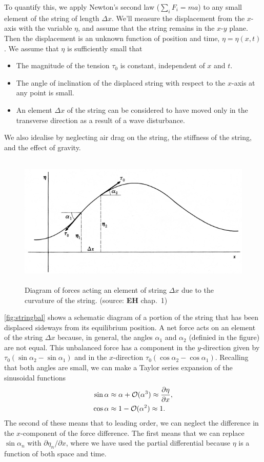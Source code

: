 \documentclass[11pt,twoside,a4paper]{article}
\begin{document}
To quantify this, we apply Newton's second law ($\sum_i F_i=ma$) to
any small element of the string of length $\Delta x$. We'll measure
the displacement from the $x$-axis with the variable $\eta$, and
assume that the string remains in the $x$-$y$ plane.  Then the
displacement is an unknown function of position and time,
$\eta=\eta(x,t)$.  We assume that $\eta$ is sufficiently small that
\begin{itemize}
\item The magnitude of the tension $\tau_0$ is constant, independent
  of $x$ and $t$.
\item The angle of inclination of the displaced string with respect to
  the $x$-axis at any point is small.
\item An element $\Delta x$ of the string can be considered to have
  moved only in the transverse direction as a result of a wave
  disturbance.
\end{itemize}
We also idealise by neglecting air drag on the string, the stiffness
of the string, and the effect of gravity.

\begin{figure}[ht]
  \centering
  \includegraphics[height=2.5in]{../figs/L19/StringDiagram}
  \caption{Diagram of forces acting an element of string $\Delta x$
    due to the curvature of the string. (source: \textbf{EH} chap.~1)}
  \label{fig:stringbal}
\end{figure}

\autoref{fig:stringbal} shows a schematic diagram of a portion of the
string that has been displaced sideways from its equilibrium
position. A net force acts on an element of the string $\Delta x$
because, in general, the angles $\alpha_1$ and $\alpha_2$ (definied in
the figure) are not equal.  This unbalanced force has a component in
the $y$-direction given by $\tau_0(\sin\alpha_2 - \sin\alpha_1)$ and
in the $x$-direction $\tau_0(\cos\alpha_2 - \cos\alpha_1)$.  Recalling
that both angles are small, we can make a Taylor series expansion of
the sinusoidal functions
\begin{align}
  \sin \alpha &\approx \alpha + \mathcal{O}(\alpha^3)\approx\frac{\partial \eta}{\partial x},\nonumber\\
  \cos \alpha &\approx 1 - \mathcal{O}(\alpha^2)\approx 1.\nonumber
\end{align}
The second of these means that to leading order, we can neglect the
difference in the $x$-component of the force difference.  The first
means that we can replace $\sin\alpha_n$ with
$\partial\eta_n/\partial x$, where we have used the partial
differential because $\eta$ is a function of both space and time.
\end{document}
